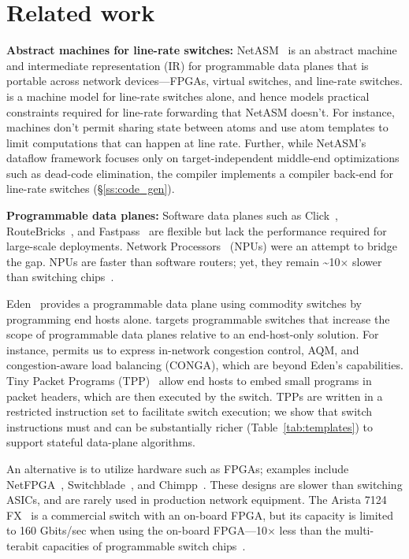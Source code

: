 \section{Related work}
\label{s:related}
\textbf{Abstract machines for line-rate switches:}
NetASM~\cite{netasm} is an abstract machine and intermediate representation
(IR) for programmable data planes that is portable across network
devices---FPGAs, virtual switches, and line-rate switches.  \absmachine is a
machine model for line-rate switches alone, and hence models practical
constraints required for line-rate forwarding that NetASM doesn't. For
instance, \absmachine machines don't permit sharing state between atoms and use
atom templates to limit computations that can happen at line rate. Further,
while NetASM's dataflow framework focuses only on target-independent middle-end
optimizations such as dead-code elimination, the \pktlanguage compiler
implements a compiler back-end for line-rate switches
(\S\ref{ss:code_gen}).

\textbf{Programmable data planes:}
Software data planes such as Click~\cite{click},
RouteBricks~\cite{routebricks}, and Fastpass~\cite{fastpass} are flexible but
lack the performance required for large-scale deployments. Network
Processors~\cite{ixp2800, ixp4xx} (NPUs) were an attempt to bridge the gap.
NPUs are faster than software routers; yet, they remain
\textasciitilde10$\times$ slower than switching chips~\cite{rmt}.

Eden~\cite{eden} provides a programmable data plane using commodity switches by
programming end hosts alone. \pktlanguage targets programmable switches that
increase the scope of programmable data planes relative to an end-host-only
solution. For instance, \pktlanguage permits us to express in-network
congestion control, AQM, and congestion-aware load balancing (CONGA), which are
beyond Eden's capabilities. Tiny Packet Programs (TPP)~\cite{tpp} allow end
hosts to embed small programs in packet headers, which are then executed by the
switch. TPPs are written in a restricted instruction set to facilitate switch
execution; we show that switch instructions must and can be substantially
richer (Table~\ref{tab:templates}) to support stateful data-plane algorithms.

An alternative is to utilize hardware such as 
FPGAs; examples include NetFPGA~\cite{netfpga},
Switchblade~\cite{switchblade}, and Chimpp~\cite{chimpp}.  These designs are
slower than switching ASICs, and are rarely used in production network
equipment. The Arista 7124 FX~\cite{7124fx} is a commercial switch with an
on-board FPGA, but its capacity is limited to 160 Gbits/sec when using the
on-board FPGA---10$\times$ less than the multi-terabit capacities of programmable
switch chips~\cite{xpliant}.

